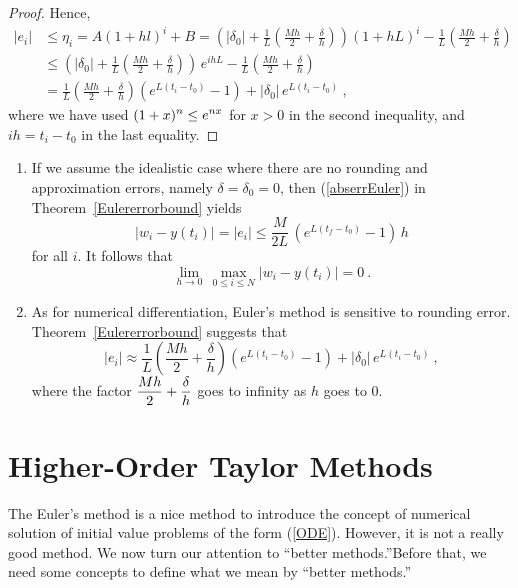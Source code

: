 \begin{proof}
Hence,
\begin{align*}
|e_i| & \leq \eta_i = A(1+hl)^i + B
= \left( |\delta_0| + \frac{1}{L}\left(\frac{Mh}{2} +
\frac{\delta}{h} \right)\right)\left(1+hL\right)^i -
\frac{1}{L}\left(\frac{Mh}{2} + \frac{\delta}{h}\right) \\
 &\leq \left( |\delta_0| + \frac{1}{L}\left(\frac{Mh}{2} +
\frac{\delta}{h} \right)\right)\,e^{ihL} -
\frac{1}{L}\left(\frac{Mh}{2} + \frac{\delta}{h}\right) \\
&= \frac{1}{L}\left(\frac{Mh}{2} + \frac{\delta}{h} \right)\left(
e^{L(t_i-t_0)} - 1 \right) + |\delta_0|\,e^{L(t_i-t_0)} \ ,
\end{align*}
where we have used $\displaystyle (1+x)^n \leq e^{nx}$ for $x > 0$ in the second
inequality, and $ih = t_i -t_0$ in the last equality.
\end{proof}

\begin{rmkList}
\begin{enumerate}
\item If we assume the idealistic case where there are no rounding
and approximation errors, namely $\delta = \delta_0 = 0$, then
(\ref{abserrEuler}) in Theorem~\ref{Eulererrorbound} yields
\[
  |w_i - y(t_i)| = |e_i| \leq \frac{M}{2L}\,\left(e^{L(t_f-t_0)} -1\right)\, h
\]
for all $i$.  It follows that
\[
  \lim_{h\to 0} \, \max_{0\leq i \leq N} |w_i - y(t_i)| = 0 \ .
\]
\item As for numerical differentiation, Euler's method is sensitive
to rounding error.  Theorem~\ref{Eulererrorbound} suggests that
\[
|e_i| \approx \frac{1}{L}\left(\frac{Mh}{2} + \frac{\delta}{h} \right)\left(
e^{L(t_i-t_0)} - 1 \right) + |\delta_0|\,e^{L(t_i-t_0)} \ ,
\]
where the factor
$\displaystyle \frac{Mh}{2} + \frac{\delta}{h}$ goes to infinity as
$h$ goes to $0$.
\end{enumerate}
\end{rmkList}

\section{Higher-Order Taylor Methods}

The Euler's method is a nice method to introduce the concept of
numerical solution of initial value problems of the form (\ref{ODE}).
However, it is not a really good method.  We now turn our attention to
``better methods.''\quad  Before that, we need some concepts to define what
we mean by ``better methods.''

